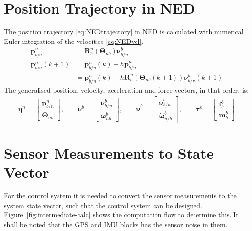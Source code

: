 \section{Position Trajectory in \acs{NED}}
The position trajectory \vref{eq:NEDtrajectory} in \ac{NED} is calculated with numerical Euler integration of the velocities \vref{eq:NEDvel}.
\begin{subequations}
\begin{align}
\dot{\mathbf{p}}^n _{b/n} &= \mathbf{R}^n _b (\boldsymbol{\Theta}_{nb}) \boldsymbol{\nu}^b _{b/n} \label{eq:NEDvel}\\
\mathbf{p}^n _{b/n}(k+1) &= \mathbf{p}^n _{b/n}(k) + h \dot{\mathbf{p}}^n _{b/n} \label{eq:NEDtrajectory} \\
&= \mathbf{p}^n _{b/n}(k) + h \mathbf{R}^n _b
(\boldsymbol{\Theta}_{nb}(k+1)) \boldsymbol{\nu}^b _{b/n}(k+1) 
\end{align}
\end{subequations}
The generalised position, velocity, acceleration and force vectors, in that order, is:
\begin{align}
\boldsymbol{\eta}^n =
\begin{bmatrix}
\mathbf{p}^n _{b/n}\\\boldsymbol{\Theta}_{nb}
\end{bmatrix},\qquad
\boldsymbol{\nu}^b =
\begin{bmatrix}
\boldsymbol{\nu}^b _{b/n}\\\boldsymbol{\omega}^b _{nb}
\end{bmatrix},\qquad
\dot{\boldsymbol{\nu}}^b =
\begin{bmatrix}
\dot{\boldsymbol{\nu}}^b _{b/n}\\\dot{\boldsymbol{\omega}}^b _{n/b}
\end{bmatrix},\qquad
\boldsymbol{\tau}^b =
\begin{bmatrix}
\mathbf{f}^b _b\\\mathbf{m}^b _b
\end{bmatrix}
\end{align}

\section{Sensor Measurements to State Vector}
For the control system it is needed to convert the sensor measurements
to the system state vector, such that the control system can be
designed. Figure~\vref{fig:intermediate-calc} shows the computation
flow to determine this. It shall be noted that the \ac{GPS} and
\ac{IMU} blocks has the sensor noise in them.

